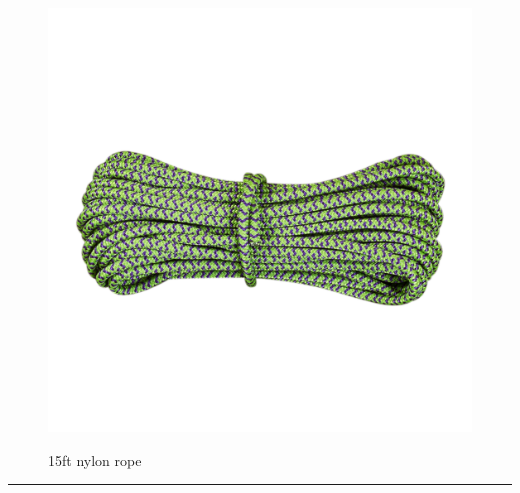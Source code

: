\documentclass{article}
\begin{document}
    \begin{figure}[H]
        \centering
        \begin{minipage}{0.25\textwidth}
            \centering
            \includegraphics[width=\textwidth]{../SurvivalItemImages/rope}
        \end{minipage}\hfill
        \begin{minipage}{0.7\textwidth}
            \centering
            \Large 15ft nylon rope
        \end{minipage}
    \end{figure}
    \vspace{-0.8em}
    \noindent\rule{\textwidth}{0.4pt}
            
    \clearpage
\end{document}
